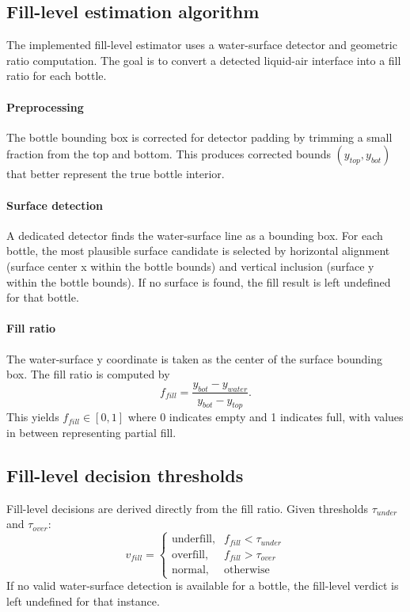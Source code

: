 \documentclass[12pt,a4paper]{report}
\begin{document}
\subsection{Fill-level estimation algorithm}
\label{subsec:fill-algo}

The implemented fill-level estimator uses a water-surface detector and geometric ratio computation. The goal is to convert a detected liquid-air interface into a fill ratio for each bottle.

\paragraph{Preprocessing} The bottle bounding box is corrected for detector padding by trimming a small fraction from the top and bottom. This produces corrected bounds $(y_{top}, y_{bot})$ that better represent the true bottle interior.

\paragraph{Surface detection} A dedicated detector finds the water-surface line as a bounding box. For each bottle, the most plausible surface candidate is selected by horizontal alignment (surface center x within the bottle bounds) and vertical inclusion (surface y within the bottle bounds). If no surface is found, the fill result is left undefined for that bottle.

\paragraph{Fill ratio} The water-surface y coordinate is taken as the center of the surface bounding box. The fill ratio is computed by
\begin{equation}
f_{fill} = \frac{y_{bot} - y_{water}}{y_{bot} - y_{top}}.
\end{equation}
This yields $f_{fill} \in [0,1]$ where 0 indicates empty and 1 indicates full, with values in between representing partial fill.

\subsection{Fill-level decision thresholds}
\label{subsec:fusion}

Fill-level decisions are derived directly from the fill ratio. Given thresholds $\tau_{under}$ and $\tau_{over}$:
\begin{equation}
v_{fill} =
\begin{cases}
\text{underfill}, & f_{fill} < \tau_{under} \\
\text{overfill},  & f_{fill} > \tau_{over} \\
\text{normal},    & \text{otherwise}
\end{cases}
\end{equation}
If no valid water-surface detection is available for a bottle, the fill-level verdict is left undefined for that instance.
\end{document}

